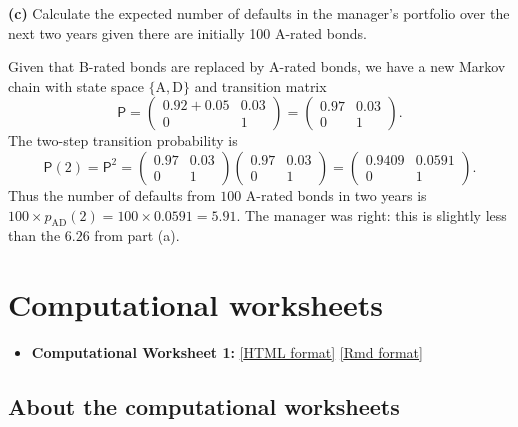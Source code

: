 \documentclass[
  a4paper,
]{article}
\providecommand{\tightlist}{%
  \setlength{\itemsep}{0pt}\setlength{\parskip}{0pt}}
\theoremstyle{definition}
\theoremstyle{definition}
\theoremstyle{definition}
\theoremstyle{remark}
\begin{document}
\textbf{(c)} Calculate the expected number of defaults in the manager's portfolio over the next two years given there are initially 100 A-rated bonds.

\begin{myanswers}

Given that B-rated bonds are replaced by A-rated bonds, we have a new Markov chain with state space \(\{\mathrm{A},\mathrm{D}\}\) and transition matrix
\[ \mathsf P = \begin{pmatrix} 0.92+0.05 & 0.03 \\ 0 & 1 \end{pmatrix} =  \begin{pmatrix} 0.97 & 0.03 \\ 0 & 1 \end{pmatrix} .  \]
The two-step transition probability is
\[ \mathsf P(2) = \mathsf P^2 =  \begin{pmatrix} 0.97 & 0.03 \\ 0 & 1 \end{pmatrix} \begin{pmatrix} 0.97 & 0.03 \\ 0 & 1 \end{pmatrix} = \begin{pmatrix} 0.9409 & 0.0591 \\ 0 & 1 \end{pmatrix} .  \]
Thus the number of defaults from \(100\) A-rated bonds in two years is \(100\times p_{\mathrm{AD}}(2) = 100\times 0.0591 = 5.91\). The manager was right: this is slightly less than the \(6.26\) from part (a).

\end{myanswers}

\hypertarget{computing}{%
\section*{Computational worksheets}\label{computing}}

\begin{itemize}
\tightlist
\item
  \textbf{Computational Worksheet 1:} \href{computing/C1.html}{{[}HTML format{]}} \href{computing/C1.Rmd}{{[}Rmd format{]}}
\end{itemize}

\hypertarget{C-about}{%
\subsection*{About the computational worksheets}\label{C-about}}
\end{document}
